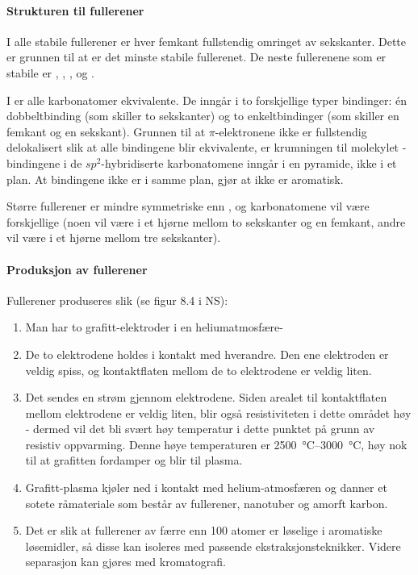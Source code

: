 \paragraph{Strukturen til fullerener} I alle stabile fullerener er hver femkant fullstendig omringet av sekskanter. Dette er grunnen til at  er det minste stabile fullerenet. De neste fullerenene som er stabile er , , ,  og .

I  er alle karbonatomer ekvivalente. De inngår i to forskjellige typer bindinger: én dobbeltbinding (som skiller to sekskanter) og to enkeltbindinger (som skiller en femkant og en sekskant). Grunnen til at $\pi$-elektronene ikke er fullstendig delokalisert slik at alle bindingene blir ekvivalente, er krumningen til molekylet - bindingene i de $sp^2$-hybridiserte karbonatomene inngår i en pyramide, ikke i et plan. At bindingene ikke er i samme plan, gjør at  ikke er aromatisk.

Større fullerener er mindre symmetriske enn , og karbonatomene vil være forskjellige (noen vil være i et hjørne mellom to sekskanter og en femkant, andre vil være i et hjørne mellom tre sekskanter).

\paragraph{Produksjon av fullerener} Fullerener produseres slik (se figur 8.4 i NS):
\begin{enumerate}
	\item Man har to grafitt-elektroder i en heliumatmosfære-
	\item De to elektrodene holdes i kontakt med hverandre. Den ene elektroden er veldig spiss, og kontaktflaten mellom de to elektrodene er veldig liten.
	\item Det sendes en strøm gjennom elektrodene. Siden arealet til kontaktflaten mellom elektrodene er veldig liten, blir også resistiviteten i dette området høy - dermed vil det bli svært høy temperatur i dette punktet på grunn av resistiv oppvarming. Denne høye temperaturen er \SIrange{2500}{3000}{\celsius}, høy nok til at grafitten fordamper og blir til plasma. 
	\item Grafitt-plasma kjøler ned i kontakt med helium-atmosfæren og danner et sotete råmateriale som består av fullerener, nanotuber og amorft karbon.
	\item Det er slik at fullerener av færre enn 100 atomer er løselige i aromatiske løsemidler, så disse kan isoleres med passende ekstraksjonsteknikker. Videre separasjon kan gjøres med kromatografi.
\end{enumerate}

